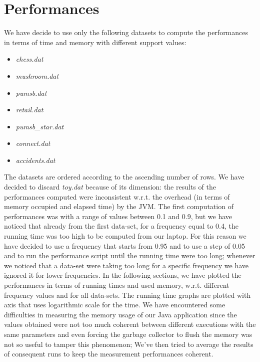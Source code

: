 \documentclass[11pt, a4paper]{article}
\begin{document}
	\section{Performances}
		We have decide to use only the following datasets to compute the performances in terms of time and memory with different support values:
		\begin{multicols}{2}
			\begin{itemize}
				\item \textit{chess.dat}
				\item \textit{mushroom.dat}
				\item \textit{pumsb.dat}
				\item \textit{retail.dat}
				\item \textit{pumsb\_star.dat}
				\item \textit{connect.dat}
				\item \textit{accidents.dat}
			\end{itemize}
		\end{multicols}
		The datasets are ordered according to the ascending number of rows.
		\newline\noindent
		We have decided to discard \textit{toy.dat} because of its dimension: the results of the performances computed were inconsistent w.r.t. the overhead (in terms of memory occupied and elapsed time) by the JVM.
		\newline\newline
		\noindent
		The first computation of performances was with a range of values between 0.1 and 0.9, but we have noticed that already from the first data-set, for a frequency equal to 0.4, the running time was too high to be computed from our laptop.\newline
		For this reason we have decided to use a frequency that starts from 0.95 and to use a step of 0.05 and to run the performance script until the running time were too long; whenever we noticed that a data-set were taking too long for a specific frequency we have ignored it for lower frequencies.
		In the following sections, we have plotted the performances in terms of running times and used memory, w.r.t. different frequency values and for all data-sets. The running time graphs are plotted with axis that uses  logarithmic scale for the time.
		We have encountered some difficulties in measuring the memory usage of our Java application since the values obtained were not too much coherent between different executions with the same parameters and even forcing the garbage collector to flush the memory was not so useful to tamper this phenomenon; We've then tried to average the results of consequent runs to keep the measurement performances coherent.
\end{document}
